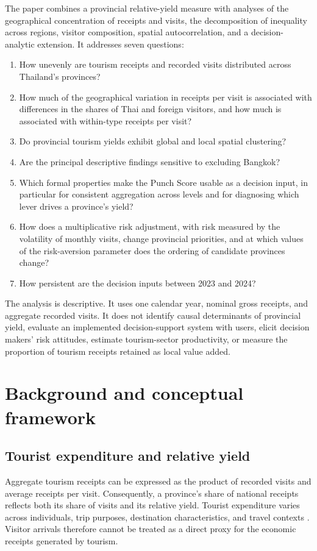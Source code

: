 \documentclass[11pt,a4paper]{article}
\theoremstyle{plain}\newtheorem{proposition}{Proposition}
\theoremstyle{definition}\newtheorem{definition}{Definition}
\begin{document}
The paper combines a provincial relative-yield measure with analyses of the geographical concentration of receipts and visits, the decomposition of inequality across regions, visitor composition, spatial autocorrelation, and a decision-analytic extension. It addresses seven questions:
\begin{enumerate}
\item How unevenly are tourism receipts and recorded visits distributed across Thailand's provinces?
\item How much of the geographical variation in receipts per visit is associated with differences in the shares of Thai and foreign visitors, and how much is associated with within-type receipts per visit?
\item Do provincial tourism yields exhibit global and local spatial clustering?
\item Are the principal descriptive findings sensitive to excluding Bangkok?
\item Which formal properties make the Punch Score usable as a decision input, in particular for consistent aggregation across levels and for diagnosing which lever drives a province's yield?
\item How does a multiplicative risk adjustment, with risk measured by the volatility of monthly visits, change provincial priorities, and at which values of the risk-aversion parameter does the ordering of candidate provinces change?
\item How persistent are the decision inputs between 2023 and 2024?
\end{enumerate}
The analysis is descriptive. It uses one calendar year, nominal gross receipts, and aggregate recorded visits. It does not identify causal determinants of provincial yield, evaluate an implemented decision-support system with users, elicit decision makers' risk attitudes, estimate tourism-sector productivity, or measure the proportion of tourism receipts retained as local value added.

\section{Background and conceptual framework}
\subsection{Tourist expenditure and relative yield}
Aggregate tourism receipts can be expressed as the product of recorded visits and average receipts per visit. Consequently, a province's share of national receipts reflects both its share of visits and its relative yield. Tourist expenditure varies across individuals, trip purposes, destination characteristics, and travel contexts \citep{wang2010,brida2013}. Visitor arrivals therefore cannot be treated as a direct proxy for the economic receipts generated by tourism.
\end{document}
